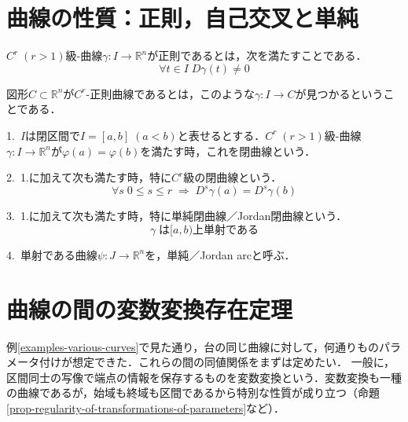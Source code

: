 \documentclass[uplatex, dvipdfmx]{jsreport}
\begin{document}
\section{曲線の性質：正則，自己交叉と単純}

\begin{definition}
    $C^r\;(r>1)$級-曲線$\gamma:I\to\mathbb{R}^n$が正則であるとは，次を満たすことである．
    \[ \forall t\in I\; D\gamma(t)\ne 0 \]
    
    図形$C\subset\mathbb{R}^n$が$C^r$-正則曲線であるとは，このような$\gamma:I\to C$が見つかるということである．
\end{definition}

\begin{definition}[閉曲線]\rm{}

    1.\, $I$は閉区間で$I=[a,b]\;(a<b)$と表せるとする．$C^r\;(r>1)$級-曲線$\gamma:I\to\mathbb{R}^n$が$\varphi(a)=\varphi(b)$を満たす時，これを閉曲線という．

    2.\, 1.に加えて次も満たす時，特に$C^r$級の閉曲線という．
    \[ \forall s \; 0\le s\le r \;\Rightarrow\; D^s\gamma(a)=D^s\gamma(b) \]

    3.\, 1.に加えて次も満たす時，特に単純閉曲線／Jordan閉曲線という．
    \[ \gamma\; は[a,b)上単射である \]

    4.\, 単射である曲線$\psi:J\to\mathbb{R}^n$を，単純／Jordan arcと呼ぶ．
\end{definition}

\begin{definition}[長さ]
    
\end{definition}

\section{曲線の間の変数変換存在定理}
例\ref{examples-various-curves}で見た通り，台の同じ曲線に対して，何通りものパラメータ付けが想定できた．これらの間の同値関係をまずは定めたい．
一般に，区間同士の写像で端点の情報を保存するものを変数変換という．変数変換も一種の曲線であるが，始域も終域も区間であるから特別な性質が成り立つ（命題\ref{prop-regularity-of-transformations-of-parameters}など）．
\end{document}
